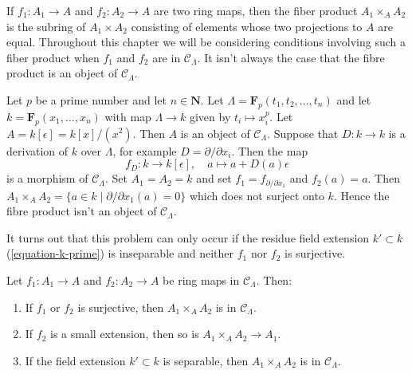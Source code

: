 \noindent
If $f_1: A_1 \to A$ and $f_2: A_2 \to A$ are two ring maps, then the fiber
product $A_1 \times_A A_2$ is the subring of $A_1 \times A_2$ consisting of
elements whose two projections to $A$ are equal. Throughout this chapter we
will be considering conditions involving such a fiber product when $f_1$
and $f_2$ are in $\mathcal{C}_\Lambda$. It isn't always the case that the
fibre product is an object of $\mathcal{C}_\Lambda$.

\begin{example}
\label{example-fibre-product}
Let $p$ be a prime number and let $n \in \mathbf{N}$.
Let $\Lambda = \mathbf{F}_p(t_1, t_2, \ldots, t_n)$ and let
$k = \mathbf{F}_p(x_1, \ldots, x_n)$ with map $\Lambda \to k$ given
by $t_i \mapsto x_i^p$. Let $A = k[\epsilon] = k[x]/(x^2)$.
Then $A$ is an object of $\mathcal{C}_\Lambda$. Suppose that
$D : k \to k$ is a derivation of $k$ over $\Lambda$, for example
$D = \partial/\partial x_i$. Then the map
$$
f_D : k \longrightarrow k[\epsilon], \quad
a \mapsto a + D(a)\epsilon
$$
is a morphism of $\mathcal{C}_\Lambda$. Set $A_1 = A_2 = k$ and set
$f_1 = f_{\partial/\partial x_1}$ and $f_2(a) = a$. Then
$A_1 \times_A A_2 = \{a \in k \mid \partial/\partial x_1(a) = 0\}$
which does not surject onto $k$. Hence the fibre product isn't
an object of $\mathcal{C}_\Lambda$.
\end{example}

\noindent
It turns out that this problem can only occur if the residue field
extension $k' \subset k$ (\ref{equation-k-prime}) is inseparable
and neither $f_1$ nor $f_2$ is surjective.

\begin{lemma}
\label{lemma-fiber-product-CLambda}
Let $f_1 : A_1 \to A$ and $f_2 : A_2 \to A$ be ring maps in
$\mathcal{C}_\Lambda$. Then:
\begin{enumerate}
\item If $f_1$ or $f_2$ is surjective, then
$A_1 \times_A A_2$ is in $\mathcal{C}_\Lambda$.
\item If $f_2$ is a small extension, then so is
$A_1 \times_A A_2 \to A_1$.
\item If the field extension $k' \subset k$ is separable, then
$A_1 \times_A A_2$ is in $\mathcal{C}_\Lambda$.
\end{enumerate}
\end{lemma}

